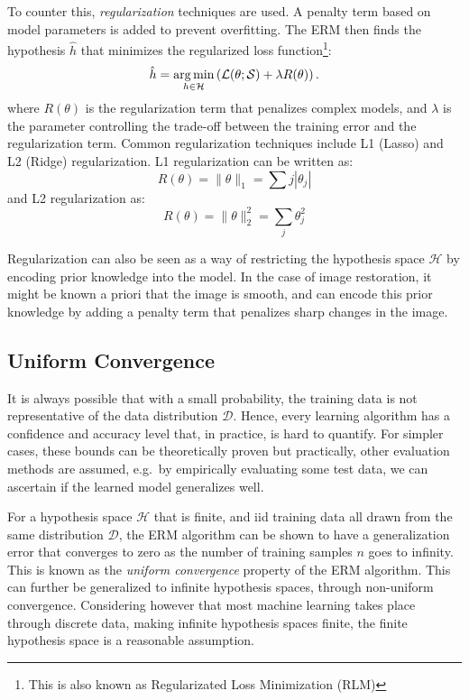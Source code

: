 To counter this, \textit{regularization} techniques are used. A penalty term based on model parameters is added to prevent overfitting. The \gls{ERM} then finds the hypothesis $\hat{h}$ that minimizes the regularized loss function\footnote{This is also known as Regularizated Loss Minimization (RLM)}:
\begin{equation}
    \hat{h} = \operatorname*{arg\,min}_{h \in \mathcal{H}} \left(\mathcal{L}(\theta; \mathcal{S})  + \lambda R(\theta) \right).
\end{equation}
where $R(\theta)$ is the regularization term that penalizes complex models, and $\lambda$ is the parameter controlling the trade-off between the training error and the regularization term. Common regularization techniques include L1 (Lasso) and L2 (Ridge) regularization. L1 regularization can be written as:
\begin{equation*}
    R(\theta) = \|\theta\|_1 = \sum{j} |\theta_j|
\end{equation*}
and L2 regularization as:
\begin{equation*}
    R(\theta) = \|\theta\|^2_2 = \sum_{j} \theta_j^2
\end{equation*}

Regularization can also be seen as a way of restricting the hypothesis space $\mathcal{H}$ by encoding prior knowledge into the model. In the case of image restoration, it might be known a priori that the image is smooth, and  can encode this prior knowledge by adding a penalty term that penalizes sharp changes in the image.


\subsection{Uniform Convergence}
It is always possible that with a small probability, the training data is not representative of the data distribution $\mathcal{D}$. Hence, every learning algorithm has a confidence and accuracy level that, in practice, is hard to quantify. For simpler cases, these bounds can be theoretically proven but practically, other evaluation methods are assumed, e.g.\ by empirically evaluating some test data, we can ascertain if the learned model generalizes well.

For a hypothesis space $\mathcal{H}$ that is finite, and \gls{iid} training data all drawn from the same distribution $\mathcal{D}$, the \gls{ERM} algorithm can be shown to have a generalization error that converges to zero as the number of training samples $n$ goes to infinity. This is known as the \textit{uniform convergence} property of the \gls{ERM} algorithm. This can further be generalized to infinite hypothesis spaces, through non-uniform convergence. Considering however that most machine learning takes place through discrete data, making infinite hypothesis spaces finite, the finite hypothesis space is a reasonable assumption.


